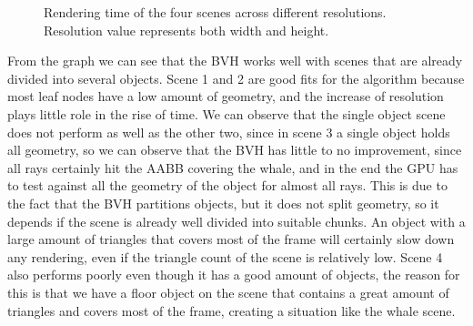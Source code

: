 \documentclass{vgtc}
\begin{document}
\begin{figure}[bth]
\centering
{}
\caption{Rendering time of the four scenes across different
  resolutions. Resolution value represents both width and height.}
\label{fig:scenes-results}
\end{figure}

From the graph we can see that the BVH works well with scenes that are
already divided into several objects. Scene 1 and 2 are good fits for
the algorithm because most leaf nodes have a low amount of geometry,
and the increase of resolution plays little role in the rise of
time. We can observe that the single object scene does not perform as
well as the other two, since in scene 3 a single object holds all
geometry, so we can observe that the BVH has little to no improvement,
since all rays certainly hit the AABB covering the whale, and in the
end the GPU has to test against all the geometry of the object for
almost all rays. This is due to the fact that the BVH partitions
objects, but it does not split geometry, so it depends if the scene
is already well divided into suitable chunks. An object with a large
amount of triangles that covers most of the frame will certainly slow
down any rendering, even if the triangle count of the scene is
relatively low. Scene 4 also performs poorly even though it has a good
amount of objects, the reason for this is that we have a floor object
on the scene that contains a great amount of triangles and covers most
of the frame, creating a situation like the whale scene.
\end{document}
